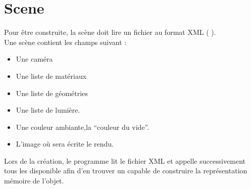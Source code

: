 \section{Scene}
Pour être construite, la scène doit lire un fichier au format XML (\cf
{}).\\

Une scène contient les champs suivant :
\begin{itemize}
  \item Une caméra
  \item Une liste de matériaux
  \item Une liste de géométries
  \item Une liste de lumière.
  \item Une couleur ambiante,\ie la ``couleur du vide''.
  \item L'image où sera écrite le rendu.
\end{itemize}

Lors de la création, le programme lit le fichier XML et appelle successivement
tous les  disponible afin d'en trouver un capable de construire
la représentation mémoire de l'objet.
